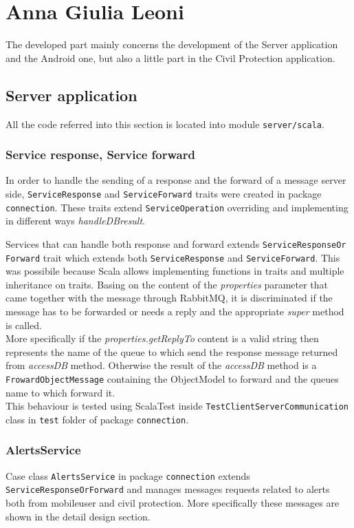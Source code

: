 \documentclass[a4paper,12pt]{report}
\begin{document}
\section{Anna Giulia Leoni}

The developed part mainly concerns the development of the Server application and the Android one, but also  a little part in the Civil Protection application.

\subsection{Server application}

All the code referred into this section is located into module \texttt{server/scala}.

\subsubsection{Service response, Service forward}
In order to handle the sending of a response and the forward of a message server side, \texttt{ServiceResponse} and \texttt{ServiceForward} traits were created in package \texttt{connection}. These traits extend \texttt{ServiceOperation} overriding and implementing in different ways \textit{handleDBresult}. 

Services that can handle both response and forward extends \texttt{ServiceResponseOr\\Forward} trait which extends both \texttt{ServiceResponse} and \texttt{ServiceForward}. This was possibile because Scala allows implementing functions in traits and multiple inheritance on traits. Basing on the content of the \textit{properties} parameter that came together with the message through RabbitMQ, it is discriminated if the message has to be forwarded or needs a reply and the appropriate \textit{super} method is called.
\\More specifically if the \textit{properties.getReplyTo} content is a valid string then represents the name of the queue to which send the response message returned from \textit{accessDB} method. Otherwise the result of the \textit{accessDB} method is a \texttt{FrowardObjectMessage} containing the ObjectModel to forward and the queues name to which forward it.
\\This behaviour is tested using ScalaTest inside \texttt{TestClientServerCommunication} class in \texttt{test} folder of package \texttt{connection}.
\\

\subsubsection{AlertsService}
Case class \texttt{AlertsService} in package \texttt{connection} extends \texttt{ServiceResponseOrForward} and manages messages requests related to alerts both from mobileuser and civil protection. More specifically these messages are shown in the detail design section.
\end{document}
